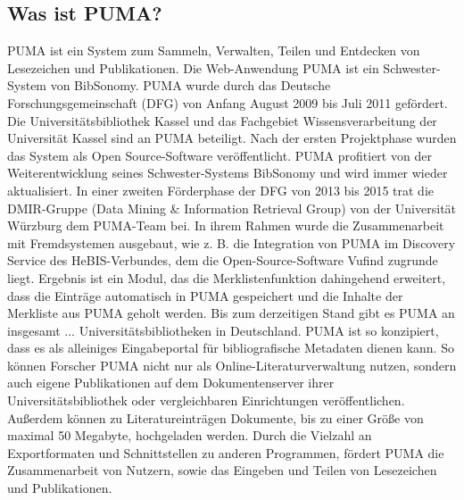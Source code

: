 \documentclass[a4paper,11pt,twoside]{scrbook}
\begin{document}
\subsection{Was ist PUMA?}
PUMA ist ein System zum Sammeln, Verwalten, Teilen und Entdecken von Lesezeichen und Publikationen. \newline
Die Web-Anwendung PUMA ist ein Schwester-System von BibSonomy.  PUMA wurde durch das Deutsche Forschungsgemeinschaft (DFG) von Anfang August 2009 bis Juli 2011 gefördert. Die Universitätsbibliothek Kassel und das Fachgebiet Wissensverarbeitung der Universität Kassel sind an PUMA beteiligt. Nach der ersten Projektphase wurden das System als Open Source-Software veröffentlicht. PUMA profitiert von der Weiterentwicklung seines Schwester-Systems BibSonomy und wird immer wieder aktualisiert. In einer zweiten Förderphase der DFG von 2013 bis 2015 trat die DMIR-Gruppe (Data Mining \& Information Retrieval Group) von der Universität Würzburg dem PUMA-Team bei. In ihrem Rahmen wurde die Zusammenarbeit mit Fremdsystemen ausgebaut, wie z. B. die Integration von PUMA im Discovery Service des HeBIS-Verbundes, dem die Open-Source-Software Vufind zugrunde liegt. Ergebnis ist ein Modul, das die Merklistenfunktion dahingehend erweitert, dass die Einträge automatisch in PUMA gespeichert und die Inhalte der Merkliste aus PUMA geholt werden. Bis zum derzeitigen Stand gibt es PUMA an insgesamt ... Universitätsbibliotheken in Deutschland.
\newline  
\newline
PUMA ist so konzipiert, dass es als alleiniges Eingabeportal für bibliografische Metadaten dienen kann. So können Forscher PUMA nicht nur als Online-Literaturverwaltung nutzen, sondern auch eigene Publikationen auf dem Dokumentenserver ihrer Universitätsbibliothek oder vergleichbaren Einrichtungen veröffentlichen. Außerdem können zu Literatureinträgen Dokumente, bis zu einer Größe von maximal 50 Megabyte, hochgeladen werden. \newline
Durch die Vielzahl an Exportformaten und Schnittstellen zu anderen Programmen, fördert PUMA  die Zusammenarbeit von Nutzern, sowie das Eingeben und Teilen von Lesezeichen und Publikationen. 
\end{document}
